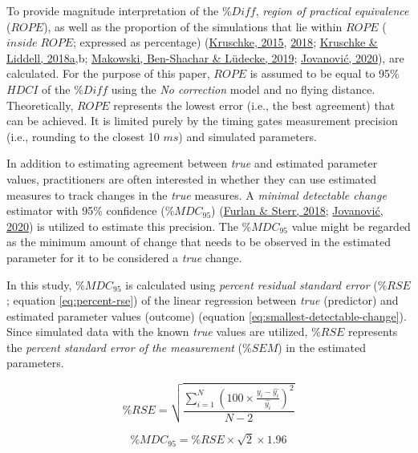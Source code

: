 \documentclass[fleqn,10pt,lineno]{wlpeerj} %
\begin{document}
To provide magnitude interpretation of the \(\%Diff\), \emph{region of practical equivalence} (\(ROPE\)), as well as the proportion of the simulations that lie within \(ROPE\) (\(inside \; ROPE\); expressed as percentage) (\protect\hyperlink{ref-kruschkeDoingBayesianData2015}{Kruschke, 2015}, \protect\hyperlink{ref-kruschkeRejectingAcceptingParameter2018}{2018}; \protect\hyperlink{ref-kruschkeBayesianDataAnalysis2018}{Kruschke \& Liddell, 2018a},b; \protect\hyperlink{ref-makowskiBayestestRDescribingEffects2019}{Makowski, Ben-Shachar \& Lüdecke, 2019}; \protect\hyperlink{ref-jovanovicBmbstatsBootstrapMagnitudebased2020}{Jovanović, 2020}), are calculated. For the purpose of this paper, \(ROPE\) is assumed to be equal to 95\% \(HDCI\) of the \(\%Diff\) using the \emph{No correction} model and no flying distance. Theoretically, \(ROPE\) represents the lowest error (i.e., the best agreement) that can be achieved. It is limited purely by the timing gates measurement precision (i.e., rounding to the closest 10 \(ms\)) and simulated parameters.

In addition to estimating agreement between \emph{true} and estimated parameter values, practitioners are often interested in whether they can use estimated measures to track changes in the \emph{true} measures. A \emph{minimal detectable change} estimator with 95\% confidence (\(\%MDC_{95}\)) (\protect\hyperlink{ref-furlanApplicabilityStandardError2018}{Furlan \& Sterr, 2018}; \protect\hyperlink{ref-jovanovicBmbstatsBootstrapMagnitudebased2020}{Jovanović, 2020}) is utilized to estimate this precision. The \(\%MDC_{95}\) value might be regarded as the minimum amount of change that needs to be observed in the estimated parameter for it to be considered a \emph{true} change.

In this study, \(\%MDC_{95}\) is calculated using \emph{percent residual standard error} (\(\%RSE\); equation \eqref{eq:percent-rse}) of the linear regression between \emph{true} (predictor) and estimated parameter values (outcome) (equation \eqref{eq:smallest-detectable-change}). Since simulated data with the known \emph{true} values are utilized, \(\%RSE\) represents the \emph{percent standard error of the measurement} (\(\%SEM\)) in the estimated parameters.

\begin{equation}
  \%RSE = \sqrt{\frac{\sum_{i=1}^N{(100 \times \frac{y_i - \hat{y_i}}{\hat{y_i}})^2}}{N-2}}  \label{eq:percent-rse}
\end{equation}

\begin{equation}
  \%MDC_{95} = \%RSE \times \sqrt{2} \times 1.96  \label{eq:smallest-detectable-change}
\end{equation}
\end{document}

